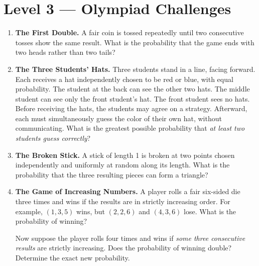 \section*{Level 3 --- Olympiad Challenges}
\begin{enumerate}[label=\textbf{\arabic*.},start=9]
\item \textbf{The First Double.} A fair coin is tossed repeatedly until two consecutive tosses show the same result. What is the probability that the game ends with two heads rather than two tails?

\item \textbf{The Three Students' Hats.} Three students stand in a line, facing forward. Each receives a hat independently chosen to be red or blue, with equal probability. The student at the back can see the other two hats. The middle student can see only the front student's hat. The front student sees no hats. Before receiving the hats, the students may agree on a strategy. Afterward, each must simultaneously guess the color of their own hat, without communicating. What is the greatest possible probability that \emph{at least two students guess correctly}?

\item \textbf{The Broken Stick.} A stick of length 1 is broken at two points chosen independently and uniformly at random along its length. What is the probability that the three resulting pieces can form a triangle?

\item \textbf{The Game of Increasing Numbers.} A player rolls a fair six-sided die three times and wins if the results are in strictly increasing order. For example, $(1,3,5)$ wins, but $(2,2,6)$ and $(4,3,6)$ lose. What is the probability of winning?

Now suppose the player rolls four times and wins if \emph{some three consecutive results} are strictly increasing. Does the probability of winning double? Determine the exact new probability.
\end{enumerate}


